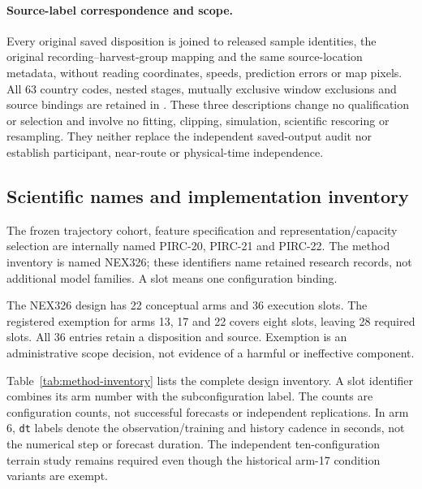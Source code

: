 \documentclass[11pt]{article}
\begin{document}
\paragraph{Source-label correspondence and scope.}
Every original saved disposition is joined to released sample identities,
the original recording--harvest-group mapping and the same source-location
metadata, without reading coordinates, speeds, prediction errors or map pixels.
All 63 country codes, nested stages, mutually exclusive window exclusions
and source bindings are retained in
.
These three descriptions change no qualification or selection and involve
no fitting, clipping, simulation, scientific rescoring or resampling.
They neither replace the independent saved-output audit nor establish
participant, near-route or physical-time independence.


\subsection{Scientific names and implementation inventory}
\label{sec:method-implementation-map}
The frozen trajectory cohort, feature specification and representation/capacity
selection are internally named PIRC-20, PIRC-21 and PIRC-22. The method
inventory is named NEX326; these identifiers name retained research records,
not additional model families. A slot means one configuration binding.

The NEX326 design has 22 conceptual arms and 36 execution slots. The registered
exemption for arms 13, 17 and 22 covers eight slots, leaving 28 required slots.
All 36 entries retain a disposition and source. Exemption is an administrative
scope decision, not evidence of a harmful or ineffective component.

\noindent Table~\ref{tab:method-inventory} lists the complete design inventory.
A slot identifier combines its arm number with the subconfiguration label.
The counts are configuration counts, not successful forecasts or independent
replications. In arm 6, \texttt{dt} labels denote the observation/training and
history cadence in seconds, not the numerical step or forecast duration.
The independent ten-configuration terrain study remains required even though
the historical arm-17 condition variants are exempt.
\end{document}
